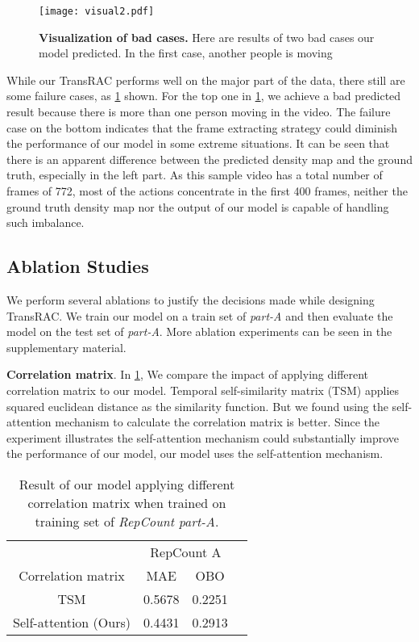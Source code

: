 \documentclass[10pt,twocolumn,letterpaper]{article}
\begin{document}
\begin{figure}[ht]
\centering

\centerline{\texttt{[image: visual2.pdf]}}\caption{
\textbf{Visualization of bad cases.} Here are  results of two bad cases our model predicted. In the first case, another people is moving}
\label{fig:badcase}
\end{figure}
While our TransRAC performs well on the major part of the data, there still are some failure cases, as \cref{fig:badcase} shown. For the top one in \cref{fig:badcase}, we achieve a bad predicted result because there is more than one person  moving in the video. The failure case on the bottom indicates that the frame extracting strategy could diminish the performance of our model in some extreme situations. It can be seen that there is an apparent difference between the predicted density map and the ground truth, especially in the left part. As this sample video has a total number of frames of 772, most of the actions concentrate in the first 400 frames, neither the ground truth density map nor the output of our model is capable of handling such imbalance. 


\subsection{Ablation Studies}

We perform several ablations to justify the decisions made while designing TransRAC. We train our model on a train set of \emph{part-A} and then evaluate the model on the test set of \emph{part-A}. More ablation experiments can be seen in the supplementary material.

\noindent \textbf{Correlation matrix}. In \cref{tab:TSM}, We compare the impact of applying different correlation matrix to our model. Temporal self-similarity matrix (TSM) \cite{RepNet} applies squared euclidean distance as the similarity function. But we found using the self-attention mechanism to calculate the correlation matrix is better. Since the experiment illustrates the self-attention mechanism could substantially improve the performance of our model, our model uses the self-attention mechanism.

\begin{table}[ht]
\centering
\begin{tabular}{c|c|cc} 
\cline{1-3}
               & \multicolumn{2}{c}{RepCount A} &   \\ 
\cline{1-3}
Correlation matrix  & MAE   & OBO  &   \\ 
\cline{1-3}
TSM          & 0.5678 & 0.2251                &   \\
Self-attention (Ours) & 0.4431 & 0.2913                &   \\
\cline{1-3}
\end{tabular}
\caption{
Result of our model applying different correlation matrix when trained on training set of \emph{RepCount part-A}.
}
\label{tab:TSM}
\end{table}
\end{document}
